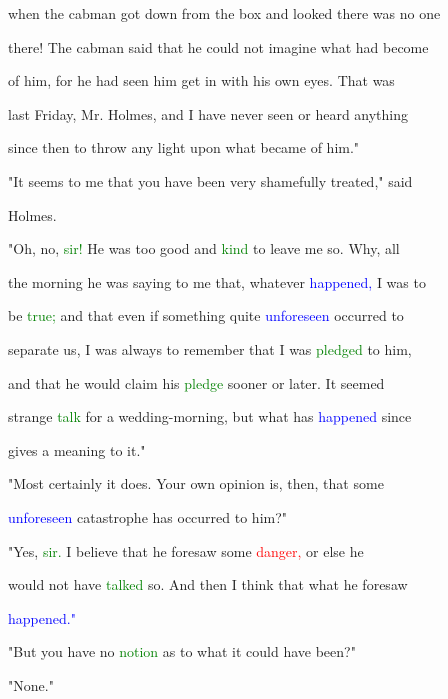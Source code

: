  when the cabman got down from the box and looked there was no one

 there! The cabman said that he could not imagine what had become

 of him, for he had seen him get in with his own eyes. That was

 last Friday, Mr. Holmes, and I have never seen or heard anything

 since then to throw any light upon what became of him."



 "It seems to me that you have been very shamefully \textcolor{BurntOrange}{treated,"} said

 Holmes.



 "Oh, no, \textcolor{green}{sir!} He was too \textcolor{BurntOrange}{good} and \textcolor{green}{kind} to \textcolor{BurntOrange}{leave} me so. Why, all

 the morning he was saying to me that, whatever \textcolor{blue}{happened,} I was to

 be \textcolor{green}{true;} and that even if something quite \textcolor{blue}{unforeseen} occurred to

 separate us, I was always to remember that I was \textcolor{green}{pledged} to him,

 and that he would claim his \textcolor{green}{pledge} sooner or later. It seemed

 strange \textcolor{green}{talk} for a wedding-morning, but what has \textcolor{blue}{happened} since

 gives a meaning to it."



 "Most certainly it does. Your own opinion is, then, that some

 \textcolor{blue}{unforeseen} \textcolor{BurntOrange}{catastrophe} has occurred to him?"



 "Yes, \textcolor{green}{sir.} I believe that he foresaw some \textcolor{red}{danger,} or else he

 would not have \textcolor{green}{talked} so. And then I think that what he foresaw

 \textcolor{blue}{happened."}



 "But you have no \textcolor{green}{notion} as to what it could have been?"



 "None."



